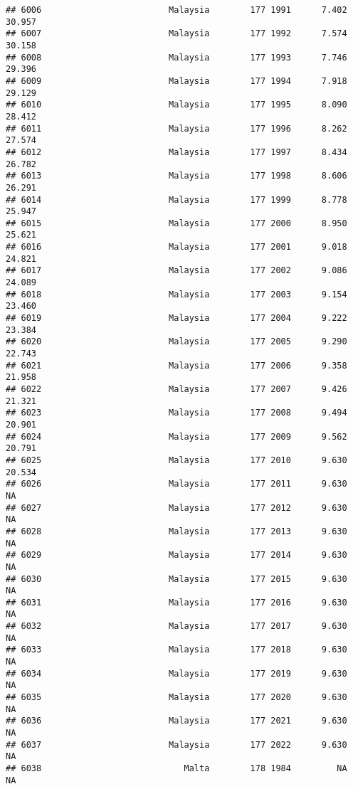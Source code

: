 \documentclass[
]{article}
\begin{document}
\begin{verbatim}
## 6006                         Malaysia        177 1991      7.402     30.957
## 6007                         Malaysia        177 1992      7.574     30.158
## 6008                         Malaysia        177 1993      7.746     29.396
## 6009                         Malaysia        177 1994      7.918     29.129
## 6010                         Malaysia        177 1995      8.090     28.412
## 6011                         Malaysia        177 1996      8.262     27.574
## 6012                         Malaysia        177 1997      8.434     26.782
## 6013                         Malaysia        177 1998      8.606     26.291
## 6014                         Malaysia        177 1999      8.778     25.947
## 6015                         Malaysia        177 2000      8.950     25.621
## 6016                         Malaysia        177 2001      9.018     24.821
## 6017                         Malaysia        177 2002      9.086     24.089
## 6018                         Malaysia        177 2003      9.154     23.460
## 6019                         Malaysia        177 2004      9.222     23.384
## 6020                         Malaysia        177 2005      9.290     22.743
## 6021                         Malaysia        177 2006      9.358     21.958
## 6022                         Malaysia        177 2007      9.426     21.321
## 6023                         Malaysia        177 2008      9.494     20.901
## 6024                         Malaysia        177 2009      9.562     20.791
## 6025                         Malaysia        177 2010      9.630     20.534
## 6026                         Malaysia        177 2011      9.630         NA
## 6027                         Malaysia        177 2012      9.630         NA
## 6028                         Malaysia        177 2013      9.630         NA
## 6029                         Malaysia        177 2014      9.630         NA
## 6030                         Malaysia        177 2015      9.630         NA
## 6031                         Malaysia        177 2016      9.630         NA
## 6032                         Malaysia        177 2017      9.630         NA
## 6033                         Malaysia        177 2018      9.630         NA
## 6034                         Malaysia        177 2019      9.630         NA
## 6035                         Malaysia        177 2020      9.630         NA
## 6036                         Malaysia        177 2021      9.630         NA
## 6037                         Malaysia        177 2022      9.630         NA
## 6038                            Malta        178 1984         NA         NA

\end{verbatim}
\end{document}
